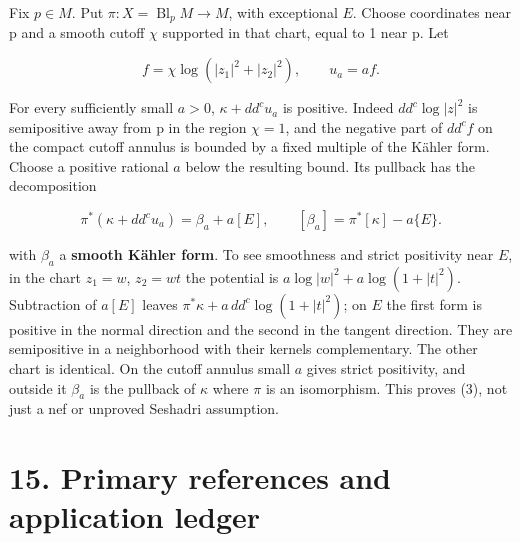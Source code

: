 \documentclass[11pt]{article}
\begin{document}
Fix $p\in M$. Put $\pi:X=\operatorname{Bl}_pM\to M$, with exceptional $E$. Choose coordinates near p and a smooth cutoff $\chi$ supported in that chart, equal to 1 near p. Let

\[f=\chi\log(|z_1|^2+|z_2|^2),\qquad u_a=af.\]

For every sufficiently small $a>0$, $\kappa+dd^c u_a$ is positive. Indeed $dd^c\log|z|^2$ is semipositive away from p in the region $\chi=1$, and the negative part of $dd^cf$ on the compact cutoff annulus is bounded by a fixed multiple of the Kähler form. Choose a positive rational $a$ below the resulting bound. Its pullback has the decomposition

\[\pi^*(\kappa+dd^c u_a)=\beta_a+a[E],\qquad[\beta_a]=\pi^*[\kappa]-a\{E\}.\tag{3}\]

with $\beta_a$ a \textbf{smooth Kähler form}. To see smoothness and strict positivity near $E$, in the chart $z_1=w$, $z_2=wt$ the potential is $a\log|w|^2+a\log(1+|t|^2)$. Subtraction of $a[E]$ leaves $\pi^*\kappa+a\,dd^c\log(1+|t|^2)$; on $E$ the first form is positive in the normal direction and the second in the tangent direction. They are semipositive in a neighborhood with their kernels complementary. The other chart is identical. On the cutoff annulus small $a$ gives strict positivity, and outside it $\beta_a$ is the pullback of $\kappa$ where $\pi$ is an isomorphism. This proves (3), not just a nef or unproved Seshadri assumption.

\section*{15. Primary references and application ledger}
\end{document}
